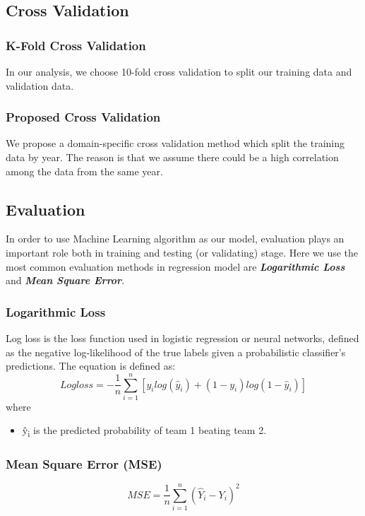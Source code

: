 \documentclass[
10pt, %
a4paper, %
oneside, %
headinclude,footinclude, %
BCOR5mm, %
]{scrartcl}
\begin{document}
\subsection{Cross Validation}
\subsubsection{K-Fold Cross Validation}
In our analysis, we choose 10-fold cross validation to split our training data and validation data.
\subsubsection{Proposed Cross Validation}
We propose a domain-specific cross validation method which split the training data by year. The reason is that we assume there could be a high correlation among the data from the same year.
\subsection{Evaluation}
In order to use Machine Learning algorithm as our model, evaluation plays an important role both in training and testing (or validating) stage. Here we use the most common evaluation methods in regression model are \textbf{\textit{Logarithmic Loss}} and \textbf{\textit{Mean Square Error}}.
\subsubsection{Logarithmic Loss}
Log loss is the loss function used in logistic regression or neural networks, defined as the negative log-likelihood of the true labels given a probabilistic classifier’s predictions. The equation is defined as: 
\begin{equation}
Logloss = -\frac{1}{n}\sum_{i=1}^{n}\left [ y_{i}log\left (\hat{y}_{i} \right ) + \left ( 1-y_{i} \right )log\left ( 1-\hat{y}_{i} \right ) \right]
\end{equation}
where 
\begin{itemize}
\item \^{y}\textsubscript{i} is the predicted probability of team 1 beating team 2.
\end{itemize}
\subsubsection{Mean Square Error (MSE)}
\begin{equation}
MSE = \frac{1}{n}\sum_{i=1}^{n}\left ( \hat{Y}_{i} - Y_{i} \right )^{2}
\end{equation}
\end{document}
